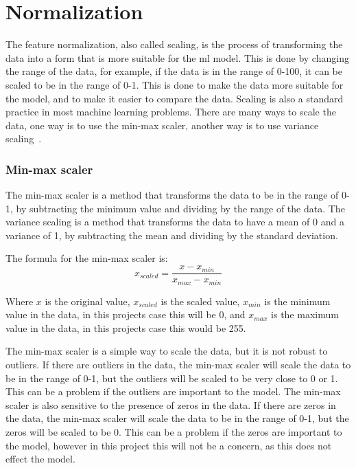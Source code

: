 \section{Normalization}\label{sec:normalization}
The feature normalization, also called scaling, is the process of transforming the data into a form that is more suitable for the \gls{ml} model. This is done by changing the range of the data, for example, if the data is in the range of 0-100, it can be scaled to be in the range of 0-1. This is done to make the data more suitable for the model, and to make it easier to compare the data. Scaling is also a standard practice in most machine learning problems. There are many ways to scale the data, one way is to use the min-max scaler, another way is to use variance scaling~\cite{Feature-engineering-zheng}. 
\subsubsection{Min-max scaler}
The min-max scaler is a method that transforms the data to be in the range of 0-1, by subtracting the minimum value and dividing by the range of the data. The variance scaling is a method that transforms the data to have a mean of 0 and a variance of 1, by subtracting the mean and dividing by the standard deviation.

The formula for the min-max scaler is:
\begin{equation}
    x_{scaled} = \frac{x - x_{min}}{x_{max} - x_{min}}
\end{equation}

Where $x$ is the original value, $x_{scaled}$ is the scaled value, $x_{min}$ is the minimum value in the data, in this projects case this will be 0, and $x_{max}$ is the maximum value in the data, in this projects case this would be 255. 

The min-max scaler is a simple way to scale the data, but it is not robust to outliers. If there are outliers in the data, the min-max scaler will scale the data to be in the range of 0-1, but the outliers will be scaled to be very close to 0 or 1. This can be a problem if the outliers are important to the model. The min-max scaler is also sensitive to the presence of zeros in the data. If there are zeros in the data, the min-max scaler will scale the data to be in the range of 0-1, but the zeros will be scaled to be 0. This can be a problem if the zeros are important to the model, however in this project this will not be a concern, as this does not effect the model. 
